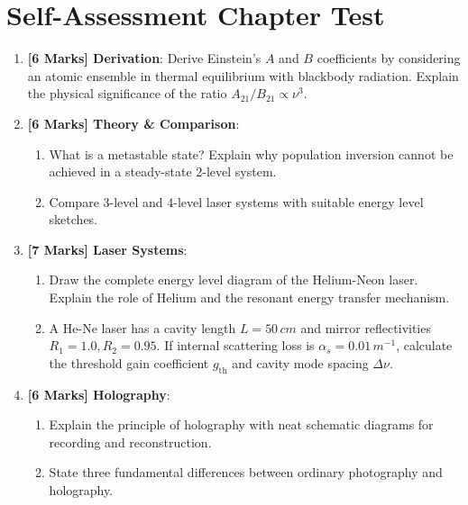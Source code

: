 \section{Self-Assessment Chapter Test}

\begin{chaptertest}
\begin{enumerate}
    \item \textbf{[6 Marks] Derivation}: Derive Einstein's $A$ and $B$ coefficients by considering an atomic ensemble in thermal equilibrium with blackbody radiation. Explain the physical significance of the ratio $A_{21}/B_{21} \propto \nu^3$.
    
    \item \textbf{[6 Marks] Theory \& Comparison}:
    \begin{enumerate}
        \item What is a metastable state? Explain why population inversion cannot be achieved in a steady-state 2-level system.
        \item Compare 3-level and 4-level laser systems with suitable energy level sketches.
    \end{enumerate}
    
    \item \textbf{[7 Marks] Laser Systems}:
    \begin{enumerate}
        \item Draw the complete energy level diagram of the Helium-Neon laser. Explain the role of Helium and the resonant energy transfer mechanism.
        \item A He-Ne laser has a cavity length $L = 50\,\si{cm}$ and mirror reflectivities $R_1 = 1.0, R_2 = 0.95$. If internal scattering loss is $\alpha_s = 0.01\,\si{m^{-1}}$, calculate the threshold gain coefficient $g_{\text{th}}$ and cavity mode spacing $\Delta \nu$.
    \end{enumerate}
    
    \item \textbf{[6 Marks] Holography}:
    \begin{enumerate}
        \item Explain the principle of holography with neat schematic diagrams for recording and reconstruction.
        \item State three fundamental differences between ordinary photography and holography.
    \end{enumerate}
\end{enumerate}
\end{chaptertest}

